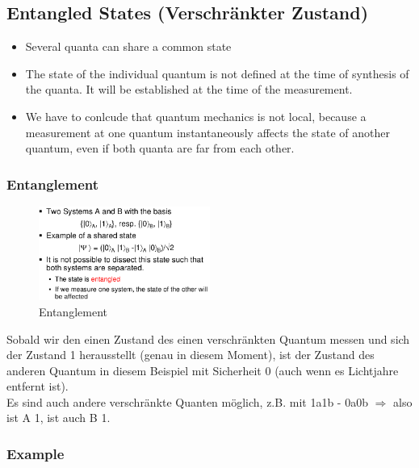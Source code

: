 \hypertarget{entangled-states-verschruxe4nkter-zustand}{%
\subsection{Entangled States (Verschränkter
Zustand)}\label{entangled-states-verschruxe4nkter-zustand}}

\begin{itemize}
\tightlist
\item
  Several quanta can share a common state
\item
  The state of the individual quantum is not defined at the time of
  synthesis of the quanta. It will be established at the time of the
  measurement.
\item
  We have to conlcude that quantum mechanics is not local, because a
  measurement at one quantum instantaneously affects the state of
  another quantum, even if both quanta are far from each other.
\end{itemize}

\hypertarget{entanglement}{%
\subsubsection{Entanglement}\label{entanglement}}

\begin{figure}[H]
\centering
\includegraphics[width=0.5\textwidth]{figures/entanglement.png}
\caption{Entanglement}
\end{figure}

Sobald wir den einen Zustand des einen verschränkten Quantum messen und
sich der Zustand 1 herausstellt (genau in diesem Moment), ist der
Zustand des anderen Quantum in diesem Beispiel mit Sicherheit 0 (auch
wenn es Lichtjahre entfernt ist).\\
Es sind auch andere verschränkte Quanten möglich, z.B. mit 1a1b - 0a0b
$\Rightarrow$ also ist A 1, ist auch B 1.

\hypertarget{example}{%
\subsubsection{Example}\label{example}}

